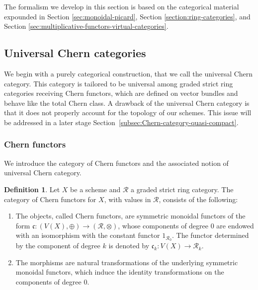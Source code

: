\documentclass[11pt]{article}
\theoremstyle{plain}
\theoremstyle{definition}
\newtheorem{definition}[theorem]{Definition}
\newcommand{\Rcal}{\mathcal R}
\newcommand{\cfrak}{\mathfrak c}
\begin{document}
The formalism we develop in this section is based on the categorical material expounded in Section \ref{sec:monoidal-picard}, Section \ref{section:ring-categories}, and Section \ref{sec:multiplicative-functors-virtual-categories}.

\subsection{Universal Chern categories}\label{subsec:universal-chern-categories}
We begin with a purely categorical construction, that we call the universal Chern category. This category is tailored to be universal among graded strict ring categories receiving Chern functors, which are defined on vector bundles and behave like the total Chern class. A drawback of the universal Chern category is that it does not properly account for the topology of our schemes. This issue will be addressed in a later stage Section~\ref{subsec:Chern-category-quasi-compact}.

\subsubsection{Chern functors}
We introduce the category of Chern functors and the associated notion of universal Chern category.
\begin{definition}\label{def:axiom-chern-functor}
Let $X$ be a scheme and $\Rcal$ a graded strict ring category. The category of Chern functors for $X$, with values in $\Rcal$, consists of the following:
\begin{enumerate}
\item The objects, called Chern functors, are symmetric monoidal functors of the form $\cfrak: (V(X),\oplus) \to (\Rcal,\otimes)$, whose components of degree $0$ are endowed with an isomorphism with the constant functor $1_{\Rcal_{0}}$. The functor determined by the component of degree $k$ is denoted by $\cfrak_k : V(X) \to \Rcal_k$.
\item The morphisms are natural transformations of the underlying symmetric monoidal functors, which induce the identity transformations on the components of degree 0.
\end{enumerate}
\end{definition}
\end{document}
